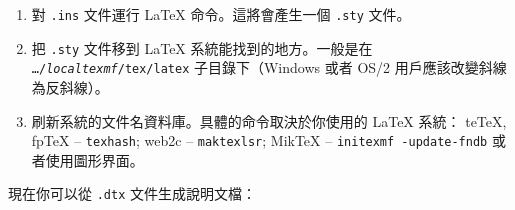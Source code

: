 
\begin{enumerate}
\item 對 \texttt{.ins} 文件運行 \LaTeX{} 命令。這將會產生一個 \texttt{.sty} 文件。
\item 把 \texttt{.sty} 文件移到 \LaTeX{} 系統能找到的地方。一般是在 
      \texttt{\ldots/\emph{localtexmf}/tex/latex} 子目錄下（Windows 或者 OS/2 用戶應該改變斜線為反斜線）。
\item 刷新系統的文件名資料庫。具體的命令取決於你使用的 \LaTeX{} 系統：
       teTeX, fpTeX -- \texttt{texhash}; web2c -- \texttt{maktexlsr};
      MikTeX -- \texttt{initexmf -update-fndb} 或者使用圖形界面。
\end{enumerate}


\noindent 現在你可以從 \texttt{.dtx} 文件生成說明文檔：

%
%


